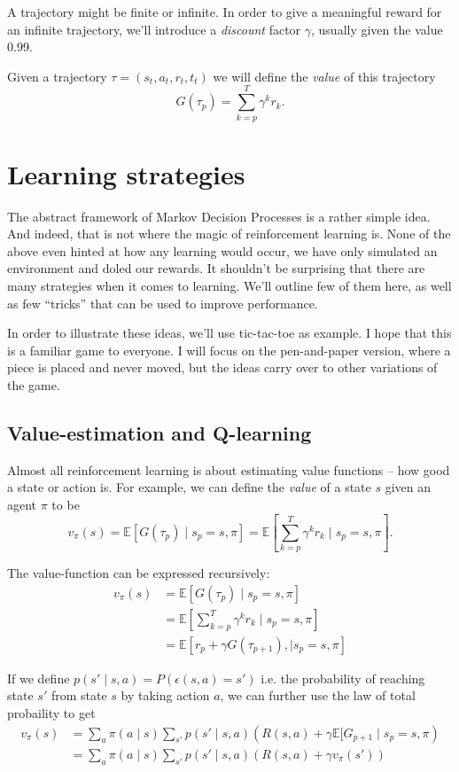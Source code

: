 \documentclass{article}
\theoremstyle{changedot}
\theoremstyle{changedotbreak}
\theoremstyle{nonumberplain}
\newcommand{\m}{\mathbb}
\begin{document}
A trajectory might be finite or infinite. In order to give a meaningful reward for an infinite trajectory, we'll introduce a \emph{discount} factor $\gamma$, usually given the value 0.99.

Given a trajectory $\tau = (s_{t}, a_{t}, r_{t}, t_{t})$ we will define the \emph{value} of this trajectory \[G(\tau_{p}) = \sum_{k=p}^{T} \gamma^{k} r_{k}.\]


\section{Learning strategies}
The abstract framework of Markov Decision Processes is a rather simple idea. And indeed, that is not where the magic of reinforcement learning is. None of the above even hinted at how any learning would occur, we have only simulated an environment and doled our rewards. It shouldn't be surprising that there are many strategies when it comes to learning. We'll outline few of them here, as well as few ``tricks'' that can be used to improve performance.

In order to illustrate these ideas, we'll use tic-tac-toe as example. I hope that this is a familiar game to everyone. I will focus on the pen-and-paper version, where a piece is placed and never moved, but the ideas carry over to other variations of the game.

\subsection{Value-estimation and Q-learning}
Almost all reinforcement learning is about estimating value functions -- how good a state or action is. For example, we can define the \emph{value} of a state $s$ given an agent $\pi$ to be \[v_{\pi}(s) = \mathbb E \left[ G(\tau_{p}) \mid s_{p} = s, \pi \right] = \m E \left[ \sum_{k=p}^{T} \gamma^{k} r_{k} \mid s_{p} = s, \pi \right].\]

The value-function can be expressed recursively:
\begin{align}
  v_{\pi}(s) &= \m E[G(\tau_{p}) \mid s_{p} = s, \pi] \\
             &= \m E\left[ \sum_{k=p}^{T} \gamma^{k} r_{k} \mid s_{p} = s, \pi \right] \\
  &= \m E \left[ r_{p} + \gamma G(\tau_{p+1}), \mid s_{p} = s, \pi \right]
\end{align}

If we define $p(s' \mid s, a) = P(\epsilon(s, a) = s')$ i.e. the probability of reaching state $s'$ from state $s$ by taking action $a$, we can further use the law of total probaility to get
\begin{align}
  v_{\pi}(s) &= \sum_{a} \pi(a \mid s) \sum_{s'} p(s' \mid s, a) \left( R(s, a) + \gamma \m E[G_{p+1} \mid s_{p} = s, \pi \right) \\
             &= \sum_{a} \pi(a \mid s) \sum_{s'} p(s' \mid s, a) \left( R(s, a) + \gamma v_{\pi}(s') \right)
\end{align}
\end{document}
